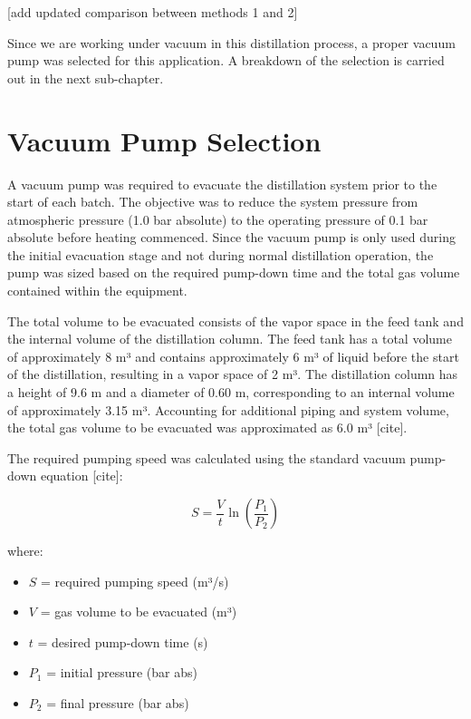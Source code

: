 {[}add updated comparison between methods 1 and 2{]}

Since we are working under vacuum in this distillation process, a proper
vacuum pump was selected for this application. A breakdown of the
selection is carried out in the next sub-chapter.

\section{Vacuum Pump Selection}\label{vacuum-pump-selection}

A vacuum pump was required to evacuate the distillation system prior to
the start of each batch. The objective was to reduce the system pressure
from atmospheric pressure (1.0 bar absolute) to the operating pressure
of 0.1 bar absolute before heating commenced. Since the vacuum pump is
only used during the initial evacuation stage and not during normal
distillation operation, the pump was sized based on the required
pump-down time and the total gas volume contained within the equipment.

The total volume to be evacuated consists of the vapor space in the feed
tank and the internal volume of the distillation column. The feed tank
has a total volume of approximately 8 m³ and contains approximately 6 m³
of liquid before the start of the distillation, resulting in a vapor
space of 2 m³. The distillation column has a height of 9.6 m and a
diameter of 0.60 m, corresponding to an internal volume of approximately
3.15 m³. Accounting for additional piping and system volume, the total
gas volume to be evacuated was approximated as 6.0 m³ {[}cite{]}.

The required pumping speed was calculated using the standard vacuum
pump-down equation {[}cite{]}:

\begin{equation}{
S=\frac{V}{t}\ln\left(\frac{P_1}{P_2}\right)
}\end{equation}

where:

\begin{itemize}
\tightlist
\item
  \(S\) = required pumping speed (m³/s)
\item
  \(V\) = gas volume to be evacuated (m³)
\item
  \(t\) = desired pump-down time (s)
\item
  \(P_1\) = initial pressure (bar abs)
\item
  \(P_2\) = final pressure (bar abs)
\end{itemize}

